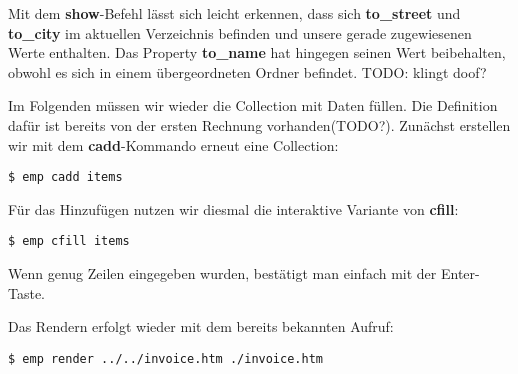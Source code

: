 Mit dem \textbf{show}-Befehl lässt sich leicht erkennen, dass sich \textbf{to\_street} und \textbf{to\_city} im aktuellen Verzeichnis befinden und unsere gerade zugewiesenen Werte enthalten.
Das Property \textbf{to\_name} hat hingegen seinen Wert beibehalten, obwohl es sich in einem übergeordneten Ordner befindet. TODO: klingt doof?

Im Folgenden müssen wir wieder die Collection mit Daten füllen. Die Definition dafür ist bereits von der ersten Rechnung vorhanden(TODO?). Zunächst erstellen wir mit dem \textbf{cadd}-Kommando erneut eine Collection:
\begin{lstlisting}[style=Bash]
$ emp cadd items
\end{lstlisting}

Für das Hinzufügen nutzen wir diesmal die interaktive Variante von \textbf{cfill}:
\begin{lstlisting}[style=Bash]
$ emp cfill items
\end{lstlisting}
Wenn genug Zeilen eingegeben wurden, bestätigt man einfach mit der Enter-Taste.

Das Rendern erfolgt wieder mit dem bereits bekannten Aufruf:

\begin{lstlisting}[style=Bash]
$ emp render ../../invoice.htm ./invoice.htm
\end{lstlisting}
